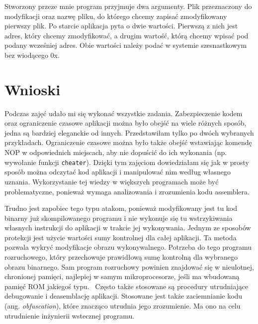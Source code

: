 \documentclass[12pt,a4paper,titlepage]{article}
\begin{document}
Stworzony przeze mnie program przyjmuje dwa argumenty. Plik przeznaczony do modyfikacji oraz nazwę pliku, do którego chcemy zapisać zmodyfikowany pierwszy plik. Po starcie aplikacja pyta o dwie wartości. Pierwszą z nich jest adres, który chcemy zmodyfikować, a drugim wartość, którą chcemy wpisać pod podany wcześniej adres. Obie wartości należy podać w systemie szesnastkowym bez wiodącego 0x.

\section{Wnioski}
Podczas zajęć udało mi się wykonać wszystkie zadania. Zabezpieczenie kodem oraz ograniczenie czasowe aplikacji można było obejść na wiele różnych sposób, jedna są bardziej eleganckie od innych. Przedstawiłam tylko po dwóch wybranych przykładach. Ograniczenie czasowe można było także obejść wstawiając komendę NOP w odpowiednich miejscach, aby nie dopuścić do ich wykonania (np. wywołanie funkcji \texttt{cheater}). Dzięki tym zajęciom dowiedziałam się jak w prosty sposób można odczytać kod aplikacji i manipulować nim według własnego uznania. Wykorzystanie tej wiedzy w większych programach może być problematyczne, ponieważ wymaga analizowania i zrozumienia kodu assemblera.

Trudno jest zapobiec tego typu atakom, ponieważ modyfikowany jest tu kod binarny już skompilowanego programu i nie wykonuje się tu wstrzykiwania własnych instrukcji do aplikacji w trakcie jej wykonywania. Jednym ze sposobów protekcji jest użycie wartości sumy kontrolnej dla całej aplikacji. Ta metoda pozwala wykryć modyfikacje obrazu wykonywalnego. Potrzeba do tego programu rozruchowego, który przechowuje prawidłową sumę kontrolną dla wybranego obrazu binarnego. Sam program rozruchowy powinien znajdować się w nieulotnej, chronionej pamięci, najlepiej w samym mikroprocesorze, jeśli ma wbudowaną pamięć ROM jakiegoś typu.~\cite{protecting-binary-executables} Często także stosowane są procedury utrudniające debugowanie i deasemblację aplikacji. Stosowane jest także zaciemnianie kodu (ang. \textit{obfuscation}), które znacząco utrudnia jego zrozumienie. Ma ono na celu utrudnienie inżynierii wstecznej programu.
\newpage


\end{document}
